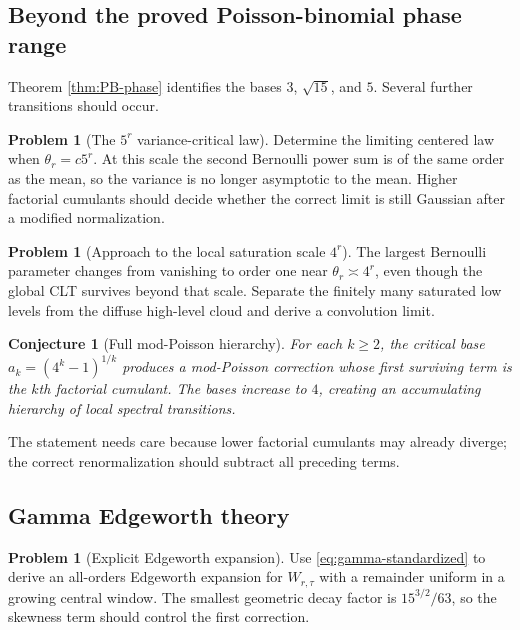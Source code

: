 \documentclass[11pt,oneside]{article}
\newtheorem{conjecture}[theorem]{Conjecture}
\theoremstyle{definition}
\newtheorem{problem}[theorem]{Problem}
\theoremstyle{remark}
\begin{document}
\subsection{Beyond the proved Poisson-binomial phase range}

Theorem \ref{thm:PB-phase} identifies the bases $3$, $\sqrt{15}$, and $5$.
Several further transitions should occur.

\begin{problem}[The $5^r$ variance-critical law]
Determine the limiting centered law when $\theta_r=c5^r$.  At this scale the
second Bernoulli power sum is of the same order as the mean, so the variance is
no longer asymptotic to the mean.  Higher factorial cumulants should decide
whether the correct limit is still Gaussian after a modified normalization.
\end{problem}

\begin{problem}[Approach to the local saturation scale $4^r$]
The largest Bernoulli parameter changes from vanishing to order one near
$\theta_r\asymp4^r$, even though the global CLT survives beyond that scale.
Separate the finitely many saturated low levels from the diffuse high-level
cloud and derive a convolution limit.
\end{problem}

\begin{conjecture}[Full mod-Poisson hierarchy]
For each $k\geq2$, the critical base
$a_k=(4^k-1)^{1/k}$ produces a mod-Poisson correction whose first surviving
term is the $k$th factorial cumulant.  The bases increase to $4$, creating an
accumulating hierarchy of local spectral transitions.
\end{conjecture}

The statement needs care because lower factorial cumulants may already
diverge; the correct renormalization should subtract all preceding terms.

\subsection{Gamma Edgeworth theory}

\begin{problem}[Explicit Edgeworth expansion]
Use \eqref{eq:gamma-standardized} to derive an all-orders Edgeworth expansion
for $W_{r,\tau}$ with a remainder uniform in a growing central window.  The
smallest geometric decay factor is
$15^{3/2}/63$, so the skewness term should control the first correction.
\end{problem}
\end{document}
